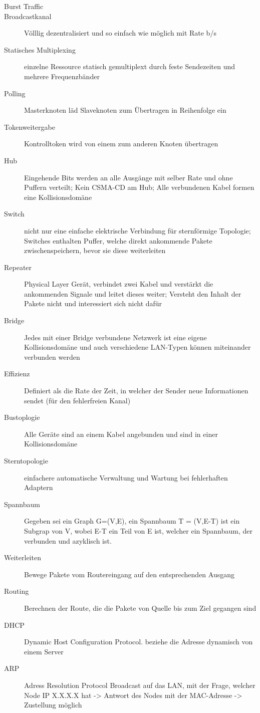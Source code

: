 \documentclass[10pt,landscape]{article}
\begin{document}
\begin{multicols}{3}
\begin{description}
    \item[Burst Traffic]
    \item[Broadcastkanal] Völllig dezentralisiert und so einfach wie möglich mit Rate b/s 
    \item[Statisches Multiplexing] einzelne Ressource statisch gemultiplext durch feste Sendezeiten und mehrere Frequenzbänder
    \item[Polling] Masterknoten läd Slaveknoten zum Übertragen in Reihenfolge ein
    \item[Tokenweitergabe] Kontrolltoken wird von einem zum anderen Knoten übertragen
    \item[Hub] Eingehende Bits werden an alle Ausgänge mit selber Rate und ohne Puffern verteilt; Kein CSMA-CD am Hub; Alle verbundenen Kabel formen eine Kollisionsdomäne
    \item[Switch] nicht nur eine einfache elektrische Verbindung für sternförmige Topologie; Switches enthalten Puffer, welche direkt ankommende Pakete zwischenspeichern, bevor sie diese weiterleiten
    \item[Repeater] Physical Layer Gerät, verbindet zwei Kabel und verstärkt die ankommenden Signale und leitet dieses weiter; Versteht den Inhalt der Pakete nicht und interessiert sich nicht dafür
    \item[Bridge] Jedes mit einer Bridge verbundene Netzwerk ist eine eigene Kollisionsdomäne und auch verschiedene LAN-Typen können miteinander verbunden werden
    \item[Effizienz] Definiert als die Rate der Zeit, in welcher der Sender neue Informationen sendet (für den fehlerfreien Kanal)
    \item[Bustoplogie] Alle Geräte sind an einem Kabel angebunden und sind in einer Kollisionsdomäne
    \item[Sterntopologie] einfachere automatische Verwaltung und Wartung bei fehlerhaften Adaptern
    \item[Spannbaum] Gegeben sei ein Graph G=(V,E), ein Spannbaum T = (V,E-T) ist ein Subgrap von V, wobei E-T ein Teil von E ist, welcher ein Spannbaum, der verbunden und azyklisch ist. 
    \item[Weiterleiten] Bewege Pakete vom Routereingang auf den entsprechenden Ausgang
    \item[Routing] Berechnen der Route, die die Pakete von Quelle bis zum Ziel gegangen sind
    \item[DHCP] Dynamic Host Configuration Protocol. beziehe die Adresse dynamisch von einem Server 
    \item[ARP] Adress Resolution Protocol Broadcast auf das LAN, mit der Frage, welcher Node IP X.X.X.X hat -> Antwort des Nodes mit der MAC-Adresse -> Zustellung möglich

\end{description}
\end{multicols}
\end{document}
